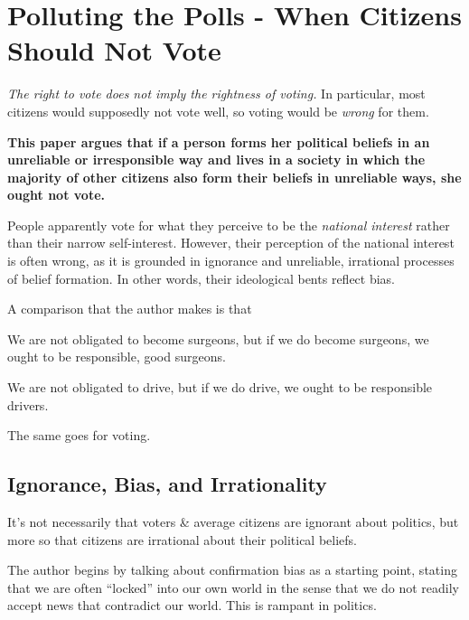 \documentclass[letterpaper]{article}
\begin{document}
\section{Polluting the Polls - When Citizens Should Not Vote}
\emph{The right to vote does not imply the rightness of voting.} In particular, most citizens would supposedly not vote well, so voting would be \emph{wrong} for them.

\bigskip 

\textbf{This paper argues that if a person forms her political beliefs in an unreliable or irresponsible way and lives in a society in which the majority of other citizens also form their beliefs in unreliable ways, she ought not vote.}

\bigskip 

People apparently vote for what they perceive to be the \emph{national interest} rather than their narrow self-interest. However, their perception of the national interest is often wrong, as it is grounded in ignorance and unreliable, irrational processes of belief formation. In other words, their ideological bents reflect bias.

\bigskip 

A comparison that the author makes is that
\begin{mdframed}[]
    We are not obligated to become surgeons, but if we do become surgeons, we ought to be responsible, good surgeons.

    \bigskip 

    We are not obligated to drive, but if we do drive, we ought to be responsible drivers. 

    \bigskip

    The same goes for voting. 
\end{mdframed}


\subsection{Ignorance, Bias, and Irrationality}
It's not necessarily that voters \& average citizens are ignorant about politics, but more so that citizens are irrational about their political beliefs. 

\bigskip 

The author begins by talking about confirmation bias as a starting point, stating that we are often ``locked'' into our own world in the sense that we do not readily accept news that contradict our world. This is rampant in politics. 

\bigskip 
\end{document}
